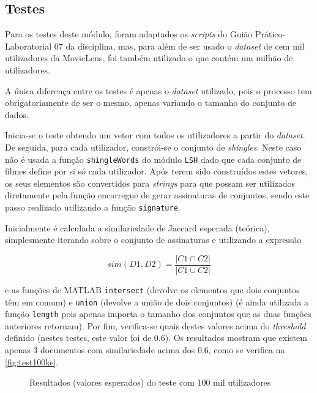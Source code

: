 \documentclass[a4paper,11pt,openright,oneside]{report}
\begin{document}
\subsection{Testes}
\label{subsec.lshtests}

Para os testes deste módulo, foram adaptados os \textit{scripts} do Guião Prático-Laboratorial 07 da disciplina, mas, para além de ser usado o \textit{dataset} de cem mil utilizadores da MovieLens, foi também utilizado o que contém um milhão de utilizadores.

A única diferença entre os testes é apenas o \textit{dataset} utilizado, pois o processo tem obrigatoriamente de ser o mesmo, apenas variando o tamanho do conjunto de dados.

Inicia-se o teste obtendo um vetor com todos os utilizadores a partir do \textit{dataset}. De seguida, para cada utilizador, constrói-se o conjunto de \textit{shingles}. Neste caso não é usada a função \texttt{shingleWords} do módulo \texttt{LSH} dado que cada conjunto de filmes define por si só cada utilizador. Após terem sido construídos estes vetores, os seus elementos são convertidos para \textit{strings} para que possam ser utilizados diretamente pela função encarregue de gerar assinaturas de conjuntos, sendo este passo realizado utilizando a função \texttt{signature}. 

Inicialmente é calculada a similariedade de Jaccard esperada (teórica), simplesmente iterando sobre o conjunto de assinaturas e utilizando a expressão 

$$ sim(D1, D2) = \frac{|C1\cap C2|}{|C1\cup C2|} $$

e as funções de MATLAB \texttt{intersect} (devolve os elementos que dois conjuntos têm em comum) e \texttt{union} (devolve a união de dois conjuntos) (é ainda utilizada a função \texttt{length} pois apenas importa o tamanho dos conjuntos que as duas funções anteriores retornam). Por fim, verifica-se quais destes valores acima do \textit{threshold} definido (nestes testes, este valor foi de 0.6). Os resultados mostram que existem apenas 3 documentos com similariedade acima dos 0.6, como se verifica na \autoref{fig:test100ke}.

\begin{figure}[ht]
\center
{}
\caption{Resultados (valores esperados) do teste com 100 mil utilizadores}
\label{fig:test100ke}
\end{figure}
\end{document}
